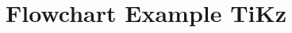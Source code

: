 \documentclass[../main.tex]{subfiles}
\begin{document}
\section{Flowchart Example TiKz}

\lipsum[1-5]
%
%
%
%
%
%
%
%
%
%
%
%
%
%
%
%
%
%
%
%
%
%
%
%
%
\end{document}
